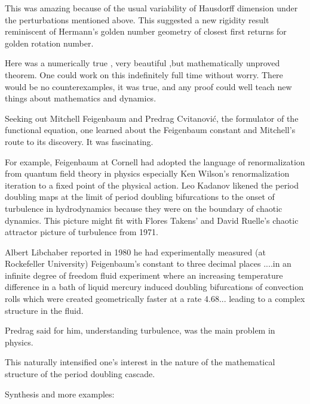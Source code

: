 \begin{description}
This was amazing  because of the usual variability of Hausdorff dimension
under  the perturbations mentioned above.  This suggested a  new rigidity
result reminiscent of Hermann's golden number geometry of closest first
returns for golden rotation number.

Here was a  numerically true , very beautiful ,but  mathematically
unproved theorem.  One could  work on  this indefinitely full time
without worry. There would be no counterexamples, it was true, and any
proof could well teach new things about mathematics and dynamics.

Seeking out   Mitchell Feigenbaum and Predrag Cvitanovi\'c, the
formulator of  the functional equation,  one learned about the
Feigenbaum constant  and  Mitchell's route to  its discovery. It was
fascinating.

For example, Feigenbaum at Cornell had adopted the language of
renormalization from quantum field theory in physics especially Ken
Wilson's renormalization iteration to a fixed point of the physical
action.
Leo Kadanov likened the period doubling maps at the limit of period
doubling bifurcations to the onset of turbulence in hydrodynamics because
they were on the  boundary of chaotic dynamics.
This picture  might fit  with  Flores Takens' and David Ruelle's chaotic
attractor picture of turbulence from 1971.

Albert  Libchaber reported in 1980  he had experimentally measured
(at Rockefeller University)%
Feigenbaum's constant to three decimal places
....in an infinite degree of freedom  fluid experiment   where an
increasing temperature difference in a bath of liquid mercury  induced
doubling bifurcations of convection rolls  which were created
geometrically  faster at a rate 4.68...  leading to a  complex structure
in the fluid.

Predrag said for him, understanding turbulence, was the main problem in physics.

This naturally intensified one's interest in the nature of the
mathematical structure of the period doubling cascade.




 Synthesis and more examples:


\end{description}
